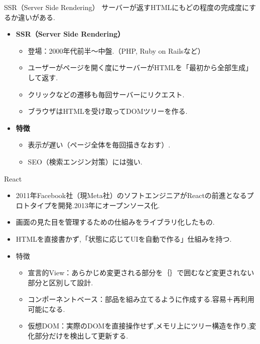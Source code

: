 \documentclass[aspectratio=169]{beamer}
\begin{document}
\begin{frame}{SSR（Server Side Rendering）}
    サーバーが返すHTMLにもどの程度の完成度にするか違いがある.\\
    \begin{itemize}
        \setlength{\parskip}{1em}
        \item \textbf{SSR（Server Side Rendering）}
        \begin{itemize}
            \setlength{\parskip}{1em}
            \item 登場：2000年代前半～中盤.（PHP, Ruby on Railsなど）
            \item ユーザーがページを開く度にサーバーがHTMLを「最初から全部生成」して返す.
            \item クリックなどの遷移も毎回サーバーにリクエスト.
            \item ブラウザはHTMLを受け取ってDOMツリーを作る.
        \end{itemize}
        \item \textbf{特徴}
        \begin{itemize}
            \setlength{\parskip}{1em}
            \item 表示が遅い（ページ全体を毎回描きなおす）.
            \item SEO（検索エンジン対策）には強い.
        \end{itemize}
    \end{itemize}
\end{frame}

\begin{frame}{React}
    \begin{itemize}
        \setlength{\parskip}{1em}
        \item 2011年Facebook社（現Meta社）のソフトエンジニアがReactの前進となるプロトタイプを開発.2013年にオープンソース化.
        \item 画面の見た目を管理するための仕組みをライブラリ化したもの.
        \item HTMLを直接書かず,「状態に応じてUIを自動で作る」仕組みを持つ.
        \item 特徴
        \begin{itemize}
            \setlength{\parskip}{1em}
            \item 宣言的View：あらかじめ変更される部分を｛｝で囲むなど変更されない部分と区別して設計.
            \item コンポーネントベース：部品を組み立てるように作成する.容易＋再利用可能になる.
            \item 仮想DOM：実際のDOMを直接操作せず,メモリ上にツリー構造を作り,変化部分だけを検出して更新する.
        \end{itemize}
    \end{itemize}    
\end{frame}
\end{document}
